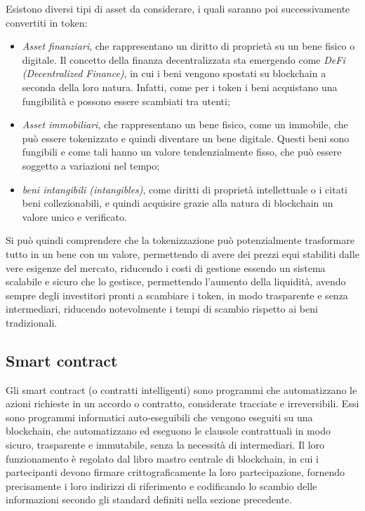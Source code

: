 Esistono diversi tipi di asset da considerare, i quali saranno poi successivamente convertiti in token:
\begin{itemize}
    \item{\textit{Asset finanziari}}, che rappresentano un diritto di proprietà su un bene fisico o digitale. Il concetto della finanza decentralizzata sta emergendo come \textit{DeFi (Decentralized Finance)},
    in cui i beni vengono spostati su blockchain a seconda della loro natura. Infatti, come per i token i beni acquistano una fungibilità e possono essere scambiati tra utenti;
    \item{\textit{Asset immobiliari}}, che rappresentano un bene fisico, come un immobile, che può essere tokenizzato e quindi diventare un bene digitale. 
    Questi beni sono fungibili e come tali hanno un valore tendenzialmente fisso, che può essere soggetto a variazioni nel tempo;
    \item{\textit{beni intangibili (intangibles)}}, come diritti di proprietà intellettuale o i citati beni collezionabili,
    e quindi acquisire grazie alla natura di blockchain un valore unico e verificato.
\end{itemize} 

Si può quindi comprendere che la tokenizzazione può potenzialmente trasformare tutto in un bene con un valore, permettendo di avere dei prezzi equi stabiliti dalle vere esigenze del mercato,
riducendo i costi di gestione essendo un sistema scalabile e sicuro che lo gestisce, permettendo l'aumento della liquidità, avendo sempre degli investitori pronti a scambiare i token, in modo trasparente
e senza intermediari, riducendo notevolmente i tempi di scambio rispetto ai beni tradizionali.

\subsection{Smart contract}\label{sec:tecnologie-blockchain-avanziate-smart-contract}
Gli smart contract (o contratti intelligenti) sono programmi che automatizzano le azioni richieste in un accordo o contratto, considerate tracciate e irreversibili. 
Essi sono programmi informatici auto-eseguibili che vengono eseguiti su una blockchain, che automatizzano ed eseguono le clausole contrattuali in modo sicuro, trasparente e immutabile, senza la necessità di intermediari.
Il loro funzionamento è regolato dal libro mastro centrale di blockchain, in cui i partecipanti devono firmare crittograficamente la loro partecipazione, fornendo precisamente i loro indirizzi di riferimento 
e codificando lo scambio delle informazioni secondo gli standard definiti nella sezione precedente. \\

